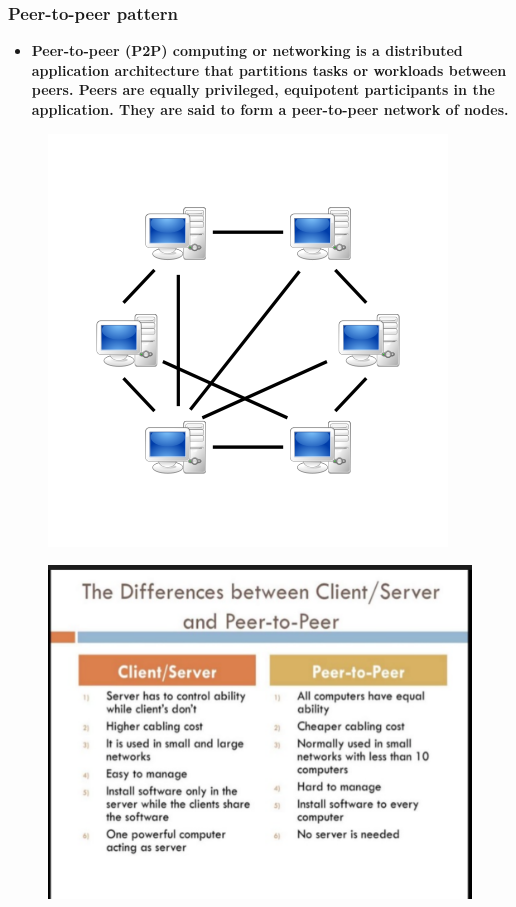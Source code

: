 \documentclass[a4paper]{article}
\begin{document}
\subsubsection{Peer-to-peer pattern}
\begin{itemize}
\item \textbf{Peer-to-peer (P2P) computing or networking is a distributed application architecture that partitions tasks or workloads between peers. Peers are equally privileged, equipotent participants in the application. They are said to form a peer-to-peer network of nodes.}
\end{itemize}

\begin{figure}[H]
\centering 
\includegraphics[scale=0.5]{images/p2p.png}
\end{figure}

\begin{figure}[H]
\centering 
\includegraphics[scale=0.5]{images/csvsp2p.png}
\end{figure}
\end{document}
